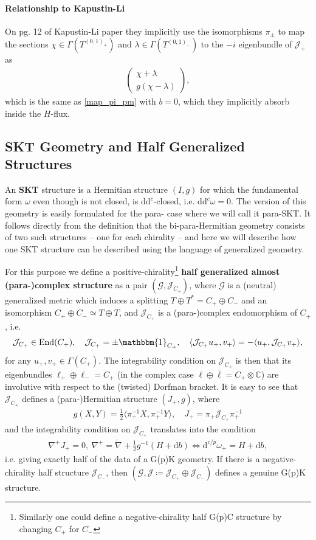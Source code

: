 \documentclass{article}
\newcommand{\TT}{{T\oplus T^*}}
\newcommand{\JJ}{\mathcal{J}}
\newcommand{\GG}{\mathcal{G}}
\newcommand{\id}{\mathbbm{1}}
\newcommand{\lc}{\mathring{\n}}
\newcommand{\n}{\nabla}
\newcommand{\rd}{\mathrm{d}}
\newcommand{\se}{\Gamma}
\newcommand{\la}{\langle}
\newcommand{\ra}{\rangle}
\theoremstyle{definition}
\theoremstyle{definition}
\theoremstyle{remark}
\DeclareMathOperator{\End}{End}
\begin{document}
\paragraph*{Relationship to Kapustin-Li}
On pg. 12 of Kapustin-Li paper they implicitly use the isomorphisms $\pi_\pm$ to map the sections $\chi \in \se(T^{(0,1)_+})$ and $\lambda \in \se(T^{(0,1)_-})$ to the $-i$ eigenbundle of $\JJ_+$ as 
\begin{align*}
\begin{pmatrix}
\chi+\lambda \\
g(\chi-\lambda)
\end{pmatrix},
\end{align*}
which is the same as \eqref{map_pi_pm} with $b=0$, which they implicitly absorb inside the $H$-flux.

\subsection{SKT Geometry and Half Generalized Structures}
An {\bf SKT} structure is a Hermitian structure $(I,g)$ for which the fundamental form $\omega$ even though is not closed, is $\rd \rd^c$-closed, i.e. $\rd \rd^c \omega=0$. The version of this geometry is easily formulated for the para- case where we will call it para-SKT. It follows directly from the definition that the bi-para-Hermitian geometry consists of two such structures -- one for each chirality -- and here we will describe how one SKT structure can be described using the language of generalized geometry.

For this purpose we define a positive-chirality\footnote{Similarly one could define a negative-chirality half G(p)C structure by changing $C_+$ for $C_-$} {\bf half generalized almost (para-)complex structure} as a pair $(\GG,\JJ_{C_+})$, where $\GG$ is a (neutral) generalized metric which induces a splitting $\TT=C_+\oplus C_-$ and an isomorphism $C_+\oplus C_-\simeq T\oplus T$, and $\JJ_{C_+}$ is a (para-)complex endomorphism of $C_+$, i.e.
\begin{align*}
\JJ_{C_+}\in \End(C_+),\quad \JJ_{C_+}=\pm \id_{C_+},\quad \la \JJ_{C_+} u_+,v_+\ra=-\la u_+,\JJ_{C_+} v_+\ra,
\end{align*}
for any $u_+,v_+ \in \se(C_+)$. The integrability condition on $\JJ_{C_+}$ is then that its eigenbundles $\ell_+\oplus \ell_-=C_+$ (in the complex case $\ell\oplus \bar{\ell}=C_+\otimes \mathbb{C}$) are involutive with respect to the (twisted) Dorfman bracket. It is easy to see that $\JJ_{C_+}$ defines a (para-)Hermitian structure $(J_+,g)$, where
\begin{align*}
g(X,Y)=\frac{1}{2}\la \pi_+^{-1}X,\pi_+^{-1}Y\ra,\quad J_+=\pi_+\JJ_{C_+}\pi^{-1}_+
\end{align*}
and the integrability condition on $\JJ_{C_+}$ translates into the condition
\begin{align*}
\n^+J_+=0,\ \n^+=\lc+\frac{1}{2}g^{-1}(H+\rd b) \Longleftrightarrow \rd^{c/p}\omega_+=H+\rd b,
\end{align*}
i.e. giving exactly half of the data of a G(p)K geometry. If there is a negative-chirality half structure $\JJ_{C_-}$, then $(\GG,\JJ\coloneqq \JJ_{C_+}\oplus \JJ_{C_-})$ defines a genuine G(p)K structure.
\end{document}
